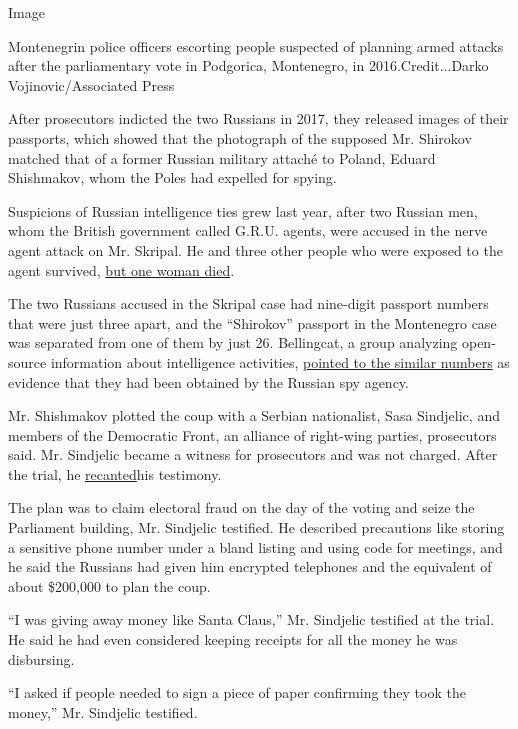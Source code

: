 Image

Montenegrin police officers escorting people suspected of planning armed
attacks after the parliamentary vote in Podgorica, Montenegro, in
2016.Credit...Darko Vojinovic/Associated Press

After prosecutors indicted the two Russians in 2017, they released
images of their passports, which showed that the photograph of the
supposed Mr. Shirokov matched that of a former Russian military attaché
to Poland, Eduard Shishmakov, whom the Poles had expelled for spying.

Suspicions of Russian intelligence ties grew last year, after two
Russian men, whom the British government called G.R.U. agents, were
accused in the nerve agent attack on Mr. Skripal. He and three other
people who were exposed to the agent survived,
\href{https://www.nytimes.com/2018/07/08/world/europe/uk-dawn-sturgess-novichok-salisbury.html}{but
one woman died}.

The two Russians accused in the Skripal case had nine-digit passport
numbers that were just three apart, and the ``Shirokov'' passport in the
Montenegro case was separated from one of them by just 26. Bellingcat, a
group analyzing open-source information about intelligence activities,
\href{https://www.bellingcat.com/news/uk-and-europe/2018/09/20/skripal-suspects-confirmed-gru-operatives-prior-european-operations-disclosed/}{pointed
to the similar numbers} as evidence that they had been obtained by the
Russian spy agency.

Mr. Shishmakov plotted the coup with a Serbian nationalist, Sasa
Sindjelic, and members of the Democratic Front, an alliance of
right-wing parties, prosecutors said. Mr. Sindjelic became a witness for
prosecutors and was not charged. After the trial, he
\href{https://balkaninsight.com/2019/03/12/montenegro-witness-retracts-coup-plot-testimony/}{recanted}his
testimony.

The plan was to claim electoral fraud on the day of the voting and seize
the Parliament building, Mr. Sindjelic testified. He described
precautions like storing a sensitive phone number under a bland listing
and using code for meetings, and he said the Russians had given him
encrypted telephones and the equivalent of about \$200,000 to plan the
coup.

``I was giving away money like Santa Claus,'' Mr. Sindjelic testified at
the trial. He said he had even considered keeping receipts for all the
money he was disbursing.

``I asked if people needed to sign a piece of paper confirming they took
the money,'' Mr. Sindjelic testified.

